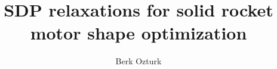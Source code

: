\documentclass[11pt]{article}
\begin{document}
    \title{SDP relaxations for solid rocket motor shape optimization}
    \author{Berk Ozturk}
    \maketitle

    

    

    

    

    

    
    
    

    
\end{document}
